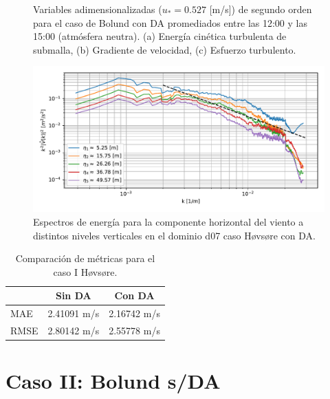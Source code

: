 \begin{figure}[H]
\begin{center}
	\end{center}
	\caption{Variables adimensionalizadas ($u_* = 0.527$ [m/s]) de segundo orden para el caso de Bolund con DA promediados entre las 12:00 y las 15:00 (atmósfera neutra). (a) Energía cinética turbulenta de submalla, (b) Gradiente de velocidad, (c) Esfuerzo turbulento. }
	\label{fig:06_hov_da_mean_secondorder}
\end{figure}

\begin{figure}[H]
	\centering
	\includegraphics[width=1.0\linewidth,page=1,trim={3mm 5mm 3mm 3mm},clip]{Imagenes/06/hov_da/spectra}%
	\caption{Espectros de energía para la componente horizontal del viento a distintos niveles verticales en el dominio d07 caso Høvsøre con DA.}
	\label{fig:06_hov_da_spectrum}
\end{figure}

\begin{table}[h!]
	\caption{Comparación de métricas para el caso I Høvsøre.}
	\label{tab:06_hov_mae_rmse}
	\centering%
	\begin{tabular}{lcc}
		\toprule
		& Sin DA & Con DA \\
		\midrule
		MAE & 2.41091 m/s & 2.16742 m/s \\
		RMSE & 2.80142 m/s& 2.55778 m/s\\
		\bottomrule
	\end{tabular}
\end{table}
\section{Caso II: Bolund s/DA}


